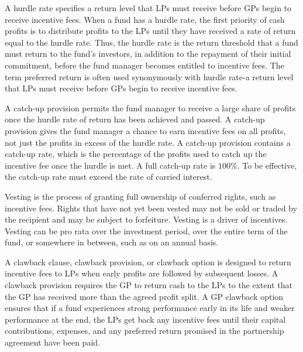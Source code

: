 \documentclass[11pt]{article}
\begin{document}
A hurdle rate specifies a return level that LPs must receive before GPs begin to receive incentive fees. When a fund has a hurdle rate, the first priority of cash profits is to distribute profits to the LPs until they have received a rate of return equal to the hurdle rate. Thus, the hurdle rate is the return threshold that a fund must return to the fund's investors, in addition to the repayment of their initial commitment, before the fund manager becomes entitled to incentive fees. The term preferred return is often used synonymously with hurdle rate-a return level that LPs must receive before GPs begin to receive incentive fees.

A catch-up provision permits the fund manager to receive a large share of profits once the hurdle rate of return has been achieved and passed. A catch-up provision gives the fund manager a chance to earn incentive fees on all profits, not just the profits in excess of the hurdle rate. A catch-up provision contains a catch-up rate, which is the percentage of the profits used to catch up the incentive fee once the hurdle is met. A full catch-up rate is $100 \%$. To be effective, the catch-up rate must exceed the rate of carried interest.

Vesting is the process of granting full ownership of conferred rights, such as incentive fees. Rights that have not yet been vested may not be sold or traded by the recipient and may be subject to forfeiture. Vesting is a driver of incentives. Vesting can be pro rata over the investment period, over the entire term of the fund, or somewhere in between, such as on an annual basis.

A clawback clause, clawback provision, or clawback option is designed to return incentive fees to LPs when early profits are followed by subsequent losses. A clawback provision requires the GP to return cash to the LPs to the extent that the GP has received more than the agreed profit split. A GP clawback option ensures that if a fund experiences strong performance early in its life and weaker performance at the end, the LPs get back any incentive fees until their capital contributions, expenses, and any preferred return promised in the partnership agreement have been paid.
\end{document}
